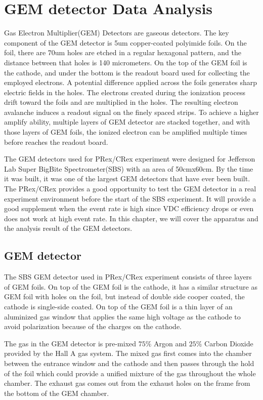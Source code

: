 \chapter{GEM detector Data Analysis}

Gas Electron Multiplier(GEM) Detectors are gaseous detectors. The key component of the GEM detector is 5um copper-coated polyimide foils. On the foil, there are 70um holes are etched in a regular hexagonal pattern, and the distance between that holes is 140 micrometers. On the top of the GEM foil is the cathode, and under the bottom is the readout board used for collecting the employed electrons. A potential difference applied across the foils generates sharp electric fields in the holes. The electrons created during the ionization process drift toward the foils and are multiplied in the holes. The resulting electron avalanche induces a readout signal on the finely spaced strips. To achieve a higher amplify ability, multiple layers of GEM detector are stacked together, and with those layers of GEM foils, the ionized electron can be amplified multiple times before reaches the readout board. 

The GEM detectors used for PRex/CRex experiment were designed for Jefferson Lab Super BigBite Spectrometer(SBS) with an area of 50cmx60cm. By the time it was built, it was one of the largest GEM detectors that have ever been built. The PRex/CRex provides a good opportunity to test the GEM detector in a real experiment environment before the start of the SBS experiment. It will provide a good supplement when the event rate is high since VDC efficiency drops or even does not work at high event rate.  In this chapter, we will cover the apparatus and the analysis result of the GEM detectors. 


\section{GEM detector}

The SBS GEM detector used in PRex/CRex experiment consists of three layers of GEM foils. On top of the GEM foil is the cathode, it has a similar structure as GEM foil with holes on the foil, but instead of double side cooper coated, the cathode is single-side coated. On top of the GEM foil is a thin layer of an aluminized gas window that applies the same high voltage as the cathode to avoid polarization because of the charges on the cathode. 

The gas in the GEM detector is pre-mixed $75\%$ Argon and $25\%$ Carbon Dioxide provided by the Hall A gas system. The mixed gas first comes into the chamber between the entrance window and the cathode and then passes through the hold of the foil which could provide a unified mixture of the gas throughout the whole chamber.  The exhaust gas  comes out from the exhaust holes on the frame from the bottom of the GEM chamber. 

